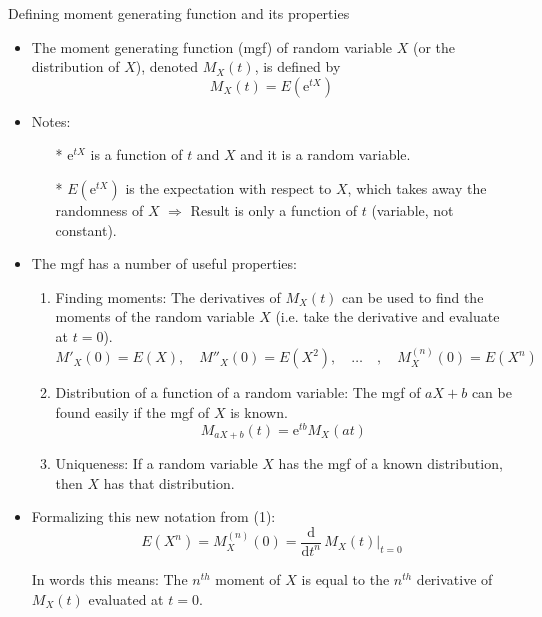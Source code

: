 \documentclass{article}
\newcommand{\e}{\mathrm{e}}		%
\newcommand{\ddx}[1]{\frac{\mathrm{d}}{\mathrm{d} #1}\,}		%
\begin{document}
Defining moment generating function and its properties\bigskip
\begin{itemize}
    \item The moment generating function (mgf) of random variable $X$ (or the distribution of $X$), denoted $M_X(t)$, is defined by
    \[M_X(t) = E(\e^{tX})\]
    \item Notes:
    \begin{itemize}
        \item[*] $\e^{tX}$ is a function of $t$ and $X$ and it is a random variable.
        \item[*] $E(\e^{tX})$ is the expectation with respect to $X$, which takes away the randomness of $X$ $\Longrightarrow$ Result is only a function of $t$ (variable, not constant).
    \end{itemize}
    \item The mgf has a number of useful properties:
    \begin{enumerate}[(1)]
        \item Finding moments: The derivatives of $M_X(t)$ can be used to find the moments of the random variable $X$ (i.e. take the derivative and evaluate at $t = 0$).
        \[M'_X(0) = E(X), \quad M''_X(0) = E(X^2), \quad \ldots \quad, \quad M_X^{(n)}(0) = E(X^n)\]
        \item Distribution of a function of a random variable: The mgf of $aX +b$ can be found easily if the mgf of $X$ is known.
        \[M_{aX + b}(t) = \e^{tb} M_X(at)\]
        \item Uniqueness: If a random variable $X$ has the mgf of a known distribution, then $X$ has that distribution.
    \end{enumerate}\bigskip 
     \item Formalizing this new notation from (1):
     \[E(X^n) = M_X^{(n)}(0) = \ddx{t^n} M_X(t)\bigg\rvert_{t = 0}\]
     \item[] In words this means: The $n^{th}$ moment of $X$ is equal to the $n^{th}$ derivative of $M_X(t)$ evaluated at $t = 0$.

\end{itemize}\bigskip
\end{document}
